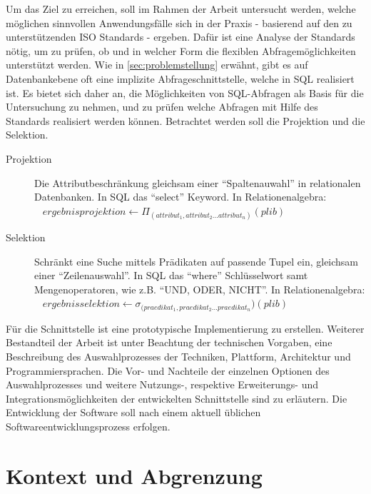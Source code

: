 Um das Ziel zu erreichen, soll im Rahmen der Arbeit untersucht werden, welche möglichen sinnvollen Anwendungsfälle sich in der Praxis - basierend auf den zu unterstützenden ISO Standards - ergeben. Dafür ist eine Analyse der Standards nötig, um zu prüfen, ob und in welcher Form die flexiblen Abfragemöglichkeiten unterstützt werden. Wie in \autoref{sec:problemstellung} erwähnt, gibt es auf Datenbankebene oft eine implizite Abfrageschnittstelle, welche in SQL realisiert ist. Es bietet sich daher an, die Möglichkeiten von SQL-Abfragen als Basis für die Untersuchung zu nehmen, und zu prüfen welche Abfragen mit Hilfe des Standards realisiert werden können. 
Betrachtet werden soll die Projektion und die Selektion.

\begin{description}
\item[Projektion] Die Attributbeschränkung gleichsam einer \enquote{Spaltenauwahl} in relationalen Datenbanken. In SQL das \enquote{select} Keyword. In Relationenalgebra: \\~
$ergebnisprojektion \leftarrow  \Pi_{(attribut_1, attribut_2... attribut_n)}(plib)$ \\

\item[Selektion] Schränkt eine Suche mittels Prädikaten auf passende Tupel ein, gleichsam einer \enquote{Zeilenauswahl}. In SQL das \enquote{where} Schlüsselwort samt Mengenoperatoren, wie z.B. \enquote{UND, ODER, NICHT}. In Relationenalgebra: \\~
$ergebnisselektion \leftarrow  \sigma_{(praedikat_1, praedikat_2... praedikat_n})(plib)$ \\

\end{description}

Für die Schnittstelle ist eine prototypische Implementierung zu erstellen. Weiterer Bestandteil der Arbeit ist unter Beachtung der technischen Vorgaben, eine Beschreibung des Auswahlprozesses der Techniken, Plattform, Architektur und Programmiersprachen. Die Vor- und Nachteile der einzelnen Optionen des Auswahlprozesses und weitere Nutzungs-, respektive Erweiterungs- und Integrationsmöglichkeiten der entwickelten Schnittstelle sind zu erläutern. 
Die Entwicklung der Software soll nach einem aktuell üblichen Softwareentwicklungsprozess erfolgen. 

\section{Kontext und Abgrenzung}

